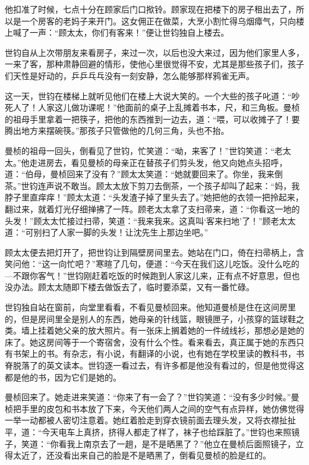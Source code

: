 \par 他扣准了时候，七点十分在顾家后门口揿铃。顾家现在把楼下的房子租出去了，所以是一个房客的老妈子来开门。这女佣正在做菜，大烹小割忙得乌烟瘴气，只向楼上喊了一声：“顾太太，你们有客来！”便让世钧独自上楼去。
\par 世钧自从上次带朋友来看房子，来过一次，以后也没大来过，因为他们家里人多，一来了客，那种肃静回避的情形，使他心里很觉得不安，尤其是那些孩子们，孩子们天性是好动的，乒乒乓乓没有一刻安静，怎么能够那样鸦雀无声。
\par 这一天，世钧在楼梯上就听见他们在楼上大说大笑的。一个大些的孩子叱道：“吵死人了！人家这儿做功课呢！”他面前的桌子上乱摊着书本，尺，和三角板。曼桢的祖母手里拿着一把筷子，把他的东西推到一边去，道：“喂，可以收摊子了！要腾出地方来摆碗筷。”那孩子只管做他的几何三角，头也不抬。
\par 曼桢的祖母一回头，倒看见了世钧，忙笑道：“呦，来客了！”世钧笑道：“老太太。”他走进房去，看见曼桢的母亲正在替孩子们剪头发，他又向她点头招呼，道：“伯母，曼桢回来了没有？”顾太太笑道：“她就要回来了。你坐，我来倒茶。”世钧连声说不敢当。顾太太放下剪刀去倒茶，一个孩子却叫了起来：“妈，我脖子里直痒痒！”顾太太道：“头发渣子掉了里头去了。”她把他的衣领一把拎起来，翻过来，就着灯光仔细掸拂了一阵。顾老太太拿了支扫帚来，道：“你看这一地的头发！”顾太太忙接过扫帚，笑道：“我来我来。这真叫‘客来扫地’了！”顾老太太道：“可别扫了人家一脚的头发！让沈先生上那边坐吧。”
\par 顾太太便去把灯开了，把世钧让到隔壁房间里去。她站在门口，倚在扫帚柄上，含笑问他：“这一向忙吧？”寒暄了几句，便道：“今天在我们这儿吃饭。没什么吃的—不跟你客气！”世钧刚赶着吃饭的时候跑到人家这儿来，正有点不好意思，但也没办法。顾太太随即下楼去做饭去了，临时要添菜，又有一番忙碌。
\par 世钧独自站在窗前，向堂里看看，不看见曼桢回来。他知道曼桢是住在这间房里的，但是房间里全是别人的东西，她母亲的针线篮，眼镜匣子，小孩穿的篮球鞋之类。墙上挂着她父亲的放大照片。有一张床上搁着她的一件绒线衫，那想必是她的床了。她这房间等于一个寄宿舍，没有什么个性。看来看去，真正属于她的东西只有书架上的书。有杂志，有小说，有翻译的小说，也有她在学校里读的教科书，书脊脱落了的英文读本。世钧逐一看过去，有许多都是他没有看过的，但是他觉得这都是他的书，因为它们是她的。
\par 曼桢回来了。她走进来笑道：“你来了有一会了？”世钧笑道：“没有多少时候。”曼桢把手里的皮包和书本放了下来，今天他们两人之间的空气有点异样，她仿佛觉得一举一动都被人密切注意着。她红着脸走到穿衣镜前面去理头发，又将衣襟扯扯平，道：“今天电车上真挤，挤得人都走了样了，袜子也给踩脏了。”世钧也来照镜子，笑道：“你看我上南京去了一趟，是不是晒黑了？”他立在曼桢后面照镜子，立得太近了，还没看出来自己的脸是不是晒黑了，倒看见曼桢的脸是红的。
